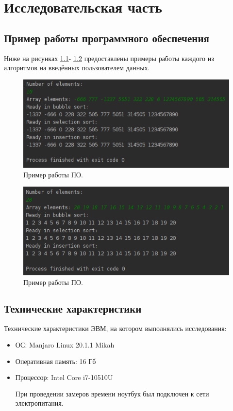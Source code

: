 \documentclass[12pt]{report}
\begin{document}
\chapter{Исследовательская часть}

\section{Пример работы программного обеспечения}
Ниже на рисунках \ref{img:exampleOut1}- \ref{img:exampleOut2} предоставлены примеры работы каждого из алгоритмов на введённых пользователем данных.

\begin{figure}
\begin{center}
\includegraphics[scale=1]{inc/img/exampleOutput.png}
\captionsetup{justification=centering}
	\caption{Пример работы ПО.}
	\label{img:exampleOut1}	
\end{center}
\end{figure}

\begin{figure}
\begin{center}
\includegraphics[scale=1]{inc/img/exampleOutput1.png}
\captionsetup{justification=centering}
	\caption{Пример работы ПО.}
	\label{img:exampleOut2}	
\end{center}
\end{figure}

\newpage

\section{Технические характеристики}
Технические характеристики ЭВМ, на котором выполнялись исследования:
\begin{itemize}
\item ОС: Manjaro Linux 20.1.1 Mikah
\item Оперативная память: 16 Гб
\item Процессор: Intel Core i7-10510U

При проведении замеров времени ноутбук был подключен к сети электропитания.
\end{itemize}
\end{document}

